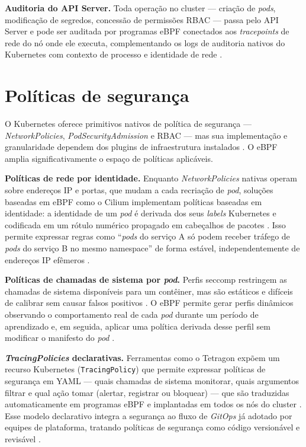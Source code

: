 \textbf{Auditoria do API Server.}
Toda operação no cluster — criação de \textit{pods}, modificação de segredos,
concessão de permissões RBAC — passa pelo API Server e pode ser auditada por
programas eBPF conectados aos \textit{tracepoints} de rede do nó onde ele executa,
complementando os logs de auditoria nativos do Kubernetes com contexto de processo
e identidade de rede \cite{gregg2019}.

\section{Políticas de segurança}

O Kubernetes oferece primitivos nativos de política de segurança —
\textit{NetworkPolicies}, \textit{PodSecurityAdmission} e RBAC — mas sua
implementação e granularidade dependem dos plugins de infraestrutura instalados
\cite{linuxkernel2024}.
O eBPF amplia significativamente o espaço de políticas aplicáveis.

\textbf{Políticas de rede por identidade.}
Enquanto \textit{NetworkPolicies} nativas operam sobre endereços IP e portas, que
mudam a cada recriação de \textit{pod}, soluções baseadas em eBPF como o Cilium
implementam políticas baseadas em identidade: a identidade de um \textit{pod} é
derivada dos seus \textit{labels} Kubernetes e codificada em um rótulo numérico
propagado em cabeçalhos de pacotes \cite{cassagnes2020}.
Isso permite expressar regras como ``\textit{pods} do serviço A só podem receber
tráfego de \textit{pods} do serviço B no mesmo namespace'' de forma estável,
independentemente de endereços IP efêmeros \cite{linuxkernel2024}.

\textbf{Políticas de chamadas de sistema por \textit{pod}.}
Perfis seccomp restringem as chamadas de sistema disponíveis para um contêiner,
mas são estáticos e difíceis de calibrar sem causar falsos positivos \cite{gregg2020}.
O eBPF permite gerar perfis dinâmicos observando o comportamento real de cada
\textit{pod} durante um período de aprendizado e, em seguida, aplicar uma política
derivada desse perfil sem modificar o manifesto do \textit{pod}
\cite{nakryiko2020}.

\textbf{\textit{TracingPolicies} declarativas.}
Ferramentas como o Tetragon expõem um recurso Kubernetes
(\texttt{TracingPolicy}) que permite expressar políticas de segurança em YAML —
quais chamadas de sistema monitorar, quais argumentos filtrar e qual ação tomar
(alertar, registrar ou bloquear) — que são traduzidas automaticamente em programas
eBPF e implantadas em todos os nós do cluster \cite{linuxkernel2024}.
Esse modelo declarativo integra a segurança ao fluxo de \textit{GitOps} já adotado
por equipes de plataforma, tratando políticas de segurança como código versionável
e revisável \cite{beyer2016}.

